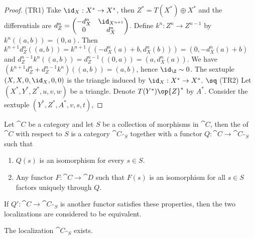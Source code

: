 \begin{proof}
    (TR1) Take ${\id}_{X}:{X}^{*}\to{X}^{*}$, then ${Z}^{*}=T({X}^{*})\oplus{X}^{*}$ and the differentials are ${d}_{Z}^{n}=\begin{pmatrix}
        -{d}_{X}^{n} & {\id}_{{X}^{n+1}} \\
        0 & {d}_{X}^{n}
    \end{pmatrix}$. Define ${k}^{n}:{Z}^{n}\to{Z}^{n-1}$ by ${k}^{n}((a,b))=(0,a)$. Then ${k}^{n+1}{d}_{Z}^{n}((a,b))={k}^{n+1}((-{d}_{X}^{n}(a)+b,{d}_{X}^{n}(b)))=(0,-{d}_{X}^{n}(a)+b)$ and ${d}_{Z}^{n-1}{k}^{n}((a,b))={d}_{Z}^{n-1}((0,a))=(a,{d}_{X}^{n}(a))$. We have $({k}^{n+1}{d}_{Z}^{n}+{d}_{Z}^{n-1}{k}^{n})((a,b))=(a,b)$, hence ${\id}_{\Z}\sim 0$. The sextuple $(X,X,0,{\id}_{X},0,0)$ is the triangle induced by ${\id}_{X}:{X}^{*}\to{X}^{*}$. $\sq$ (TR2) Let $({X}^{*},{Y}^{*},{Z}^{*},u,v,w)$ be a triangle. Denote $T({Y}^{*})\op{Z}^{*}$ by ${A}^{*}$. Consider the sextuple $({Y}^{*},{Z}^{*},{A}^{*},v,s,t)$, 
\end{proof}
\begin{definition}
    Let $\cat{C}$ be a category and let $S$ be a collection of morphisms in $\cat{C}$, then the  of $\cat{C}$ with respect to $S$ is a category ${\cat{C}}_{\cat{S}}$ together with a functor $Q:\cat{C}\to{\cat{C}}_{\cat{S}}$ such that 
    \begin{enumerate}
        \item $Q(s)$ is an isomorphism for every $s\in S$.
        \item Any functor $F:\cat{C}\to\cat{D}$ such that $F(s)$ is an isomorphism for all $s\in S$ factors uniquely through $Q$.
    \end{enumerate}
    If $Q':\cat{C}\to{\cat{C}}_{\cat{S}}$ is another functor satisfies these properties, then the two localizations are considered to be equivalent. 
\end{definition}
\begin{proposition}
    The localization ${\cat{C}}_{\cat{S}}$ exists.
\end{proposition}

